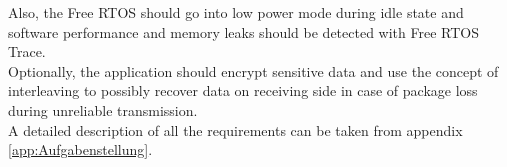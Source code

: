 Also, the Free RTOS should go into low power mode during idle state and software performance and memory leaks should be detected with Free RTOS Trace.\\
Optionally, the application should encrypt sensitive data and use the concept of interleaving to possibly recover data on receiving side in case of package loss during unreliable transmission.\\
A detailed description of all the requirements can be taken from appendix \autoref{app:Aufgabenstellung}.
